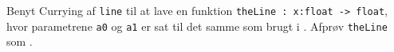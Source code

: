 \label{theLine} Benyt Currying af \lstinline{line} til at lave en funktion \lstinline{theLine : x:float -> float}, hvor parametrene \lstinline{a0} og \lstinline{a1} er sat til det samme som brugt i . Afprøv \lstinline{theLine} som .